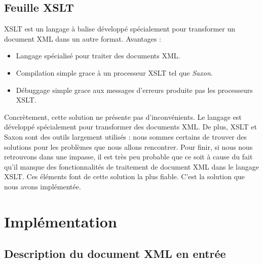 \documentclass[11pt]{report}
\begin{document}
\section{Feuille XSLT}
XSLT est un langage à balise développé spécialement pour transformer un document XML dans un autre format. 
\hfill \break
Avantages :
\begin{itemize}
\item Langage spécialisé pour traiter des documents XML.
\item Compilation simple grace à un processeur XSLT tel que \emph{Saxon}.
\item Débuggage simple grace aux messages d'erreurs produite pas les processeurs XSLT.
\end{itemize}
\hfill \break
Concrètement, cette solution ne présente pas d'inconvénients. Le langage est développé spécialement pour transformer des documents XML. De plus, XSLT et Saxon sont des outils largement utilisés : nous sommes certains de trouver des solutions pour les problèmes que nous allons rencontrer. Pour finir, si nous nous retrouvons dans une impasse, il est très peu probable que ce soit à cause du fait qu'il manque des fonctionnalités de traitement de document XML dans le langage XSLT.
\hfill \break
\hfill \break
Ces éléments font de cette solution la plus fiable. C'est la solution que nous avons implémentée.

\chapter{Implémentation}

\section{Description du document XML en entrée}
\end{document}
